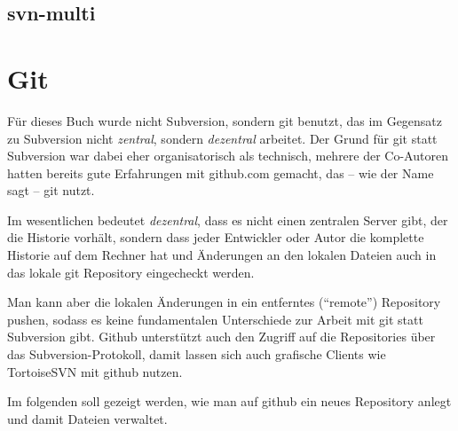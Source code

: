 \subsection{svn-multi}


\section{Git}

Für dieses Buch wurde nicht Subversion, sondern git benutzt, das im Gegensatz zu Subversion nicht \textit{zentral}, sondern \textit{dezentral} arbeitet. Der Grund für git statt Subversion war dabei eher organisatorisch als technisch, mehrere der Co-Autoren hatten bereits gute Erfahrungen mit github.com gemacht, das -- wie der Name sagt -- git nutzt.

Im wesentlichen bedeutet \textit{dezentral}, dass es nicht einen zentralen Server gibt, der die Historie vorhält, sondern dass jeder Entwickler oder Autor die komplette Historie auf dem Rechner hat und Änderungen an den lokalen Dateien auch in das lokale git Repository eingecheckt werden. 

Man kann aber die lokalen Änderungen in ein entferntes (\enquote{remote}) Repository pushen, sodass es keine fundamentalen Unterschiede zur Arbeit mit git statt Subversion gibt.
Github unterstützt auch den Zugriff auf die Repositories über das Subversion-Protokoll, damit lassen sich auch grafische Clients wie TortoiseSVN mit github nutzen. 

Im folgenden soll gezeigt werden, wie man auf github ein neues Repository anlegt und damit Dateien verwaltet.




\endinput

Die aus Sicht des Autors beste Lösung ist daher eine Sicherung außerhalb des lokalen Rechners, idealerweise auch auf einem anderen Dateisystem. Der Grund hierfür ist technisch: Es sind Fälle bekannt, in denen Trojaner nicht nur die lokalen Dateien sondern auch alle Dateien auf angeschlossenen Netzlaufwerken verschlüsselten. Eine Sicherung auf einer Netzwerkfreigabe kann daher auch zu wenig sein. 



Und noch ein weiterer Aspekt soll genannt werden: die Arbeit mit mehreren Autoren und/oder auf mehreren Rechnern. Der Autor dieses Kapitels speichert wichtige Dokumente in einem Subversion-Repository. Soll mit einem anderem Rechner an den Dateien gearbeitet werden, so wird dort einfach ein neuer Checkout gemacht. Es darf nur am Ende der Arbeit nicht vergessen werden, die Dateien auch wieder mit dem Repository abzugleichen, dieser wichtige Schritt geht einem aber nach kurzer Zeit \enquote{in Fleisch und Blut} über.

Die Zusammenarbeit in einem Team vereinfacht sich drastisch, da der mühsame und fehlerträchtige Austausch von Dateien über FTP oder Email entfällt, ältere Versionen einer Datei können problemlos wiederhergestellt werden und die Zusammenführung verschiedener Versionen vereinfacht sich. Ein nicht zu unterschätzender Vorteil ist zudem die Möglichkeit, Backups quasi im \enquote{Vorbeigehen} zu erstellen.


